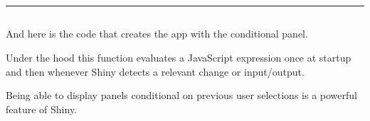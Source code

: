 \documentclass[
  letterpaper,
  DIV=11,
  numbers=noendperiod]{scrreprt}
\begin{document}
\begin{center}\rule{0.5\linewidth}{0.5pt}\end{center}

\hypertarget{section-61}{%
\subsection{}\label{section-61}}

And here is the code that creates the app with the conditional panel.

Under the hood this function evaluates a JavaScript expression once at
startup and then whenever Shiny detects a relevant change or
input/output.

Being able to display panels conditional on previous user selections is
a powerful feature of Shiny.
\end{document}
